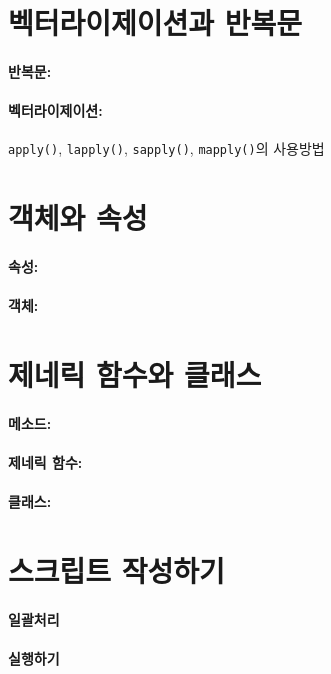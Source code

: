 \documentclass{report}
\begin{document}
\section{벡터라이제이션과 반복문} 
\paragraph{반복문:}

\paragraph{벡터라이제이션:} \texttt{apply()}, \texttt{lapply()}, \texttt{sapply()}, \texttt{mapply()}의 사용방법


\section{객체와 속성}
\paragraph{속성:}
\paragraph{객체:}

\section{제네릭 함수와 클래스}
\paragraph{메소드:}
\paragraph{제네릭 함수:}
\paragraph{클래스:}

\section{스크립트 작성하기}
\paragraph{일괄처리}
\paragraph{실행하기}
\end{document}
